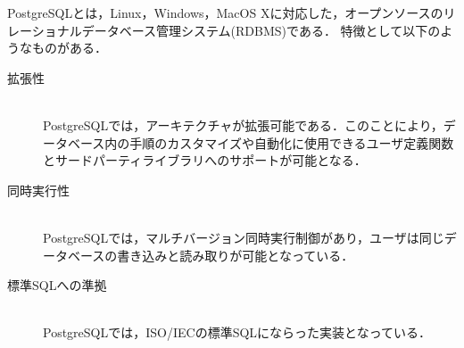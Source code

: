 PostgreSQL\cite{postgres}とは，Linux，Windows，MacOS Xに対応した，オープンソースのリレーショナルデータベース管理システム(RDBMS)である．
特徴として以下のようなものがある．
\begin{description}
    \item[拡張性]\mbox{}\\
        PostgreSQLでは，アーキテクチャが拡張可能である．このことにより，データベース内の手順のカスタマイズや自動化に使用できるユーザ定義関数とサードパーティライブラリへのサポートが可能となる．
    \item[同時実行性]\mbox{}\\
        PostgreSQLでは，マルチバージョン同時実行制御があり，ユーザは同じデータベースの書き込みと読み取りが可能となっている．
    \item[標準SQLへの準拠]\mbox{}\\
        PostgreSQLでは，ISO/IECの標準SQLにならった実装となっている．
\end{description}
